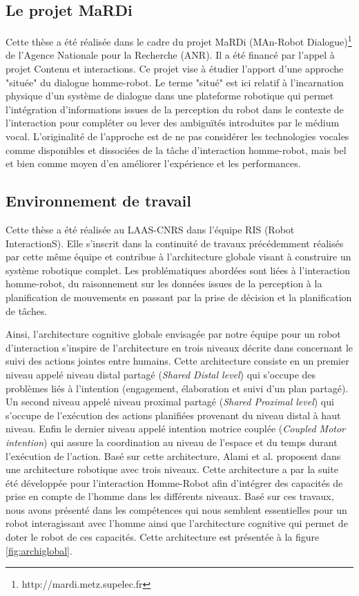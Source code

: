 \documentclass[a4paper,11pt,twoside]{StyleThese}
\begin{document}
\subsection{Le projet MaRDi}
Cette thèse a été réalisée dans le cadre du projet MaRDi (MAn-Robot Dialogue)\footnote{http://mardi.metz.supelec.fr} de l’Agence Nationale pour la Recherche (ANR). Il a été financé par l’appel à projet Contenu et interactions.
Ce projet vise à étudier l’apport d’une approche "située" du dialogue homme-robot. Le terme "situé" est ici relatif à l’incarnation physique d’un système de dialogue dans une plateforme robotique qui permet l’intégration d’informations issues de la perception du robot dans le contexte de l’interaction pour compléter ou lever des ambiguïtés introduites par le médium vocal. L’originalité de l’approche est de ne pas considérer les technologies vocales comme disponibles et dissociées de la tâche d’interaction homme-robot, mais bel et bien comme moyen d’en améliorer l’expérience et les performances.

\subsection{Environnement de travail}
\label{sec:workEnv}
Cette thèse a été réalisée au LAAS-CNRS dans l'équipe RIS (Robot InteractionS).
Elle s'inscrit dans la continuité de travaux précédemment réalisés par cette même équipe et contribue à l'architecture globale visant à construire un système robotique complet. Les problématiques abordées sont liées à l'interaction homme-robot, du raisonnement sur les données issues de la perception à la planification de mouvements en passant par la prise de décision et la planification de tâches.

Ainsi, l'architecture cognitive globale envisagée par notre équipe pour un robot d'interaction s'inspire de l'architecture en trois niveaux décrite dans \cite{pacherie2012phenomenology} concernant le suivi des actions jointes entre humains. Cette architecture consiste en un premier niveau appelé niveau distal partagé (\textit{Shared Distal level}) qui s'occupe des problèmes liés à l'intention (engagement, élaboration et suivi d'un plan partagé). Un second niveau appelé niveau proximal partagé (\textit{Shared Proximal level}) qui s'occupe de l'exécution des actions planifiées provenant du niveau distal à haut niveau. Enfin le dernier niveau appelé  intention motrice couplée (\textit{Coupled Motor intention}) qui assure la coordination au niveau de l'espace et du temps durant l'exécution de l'action.
Basé sur cette architecture, Alami et al. proposent dans \cite{alami1998architecture} une architecture robotique avec trois niveaux. Cette architecture a par la suite été développée pour l'interaction Homme-Robot \cite{alami2011robot,alami2013human,fioreiser2014} afin d'intégrer des capacités de prise en compte de l'homme dans les différents niveaux. 
Basé sur ces travaux, nous avons présenté dans \cite{Devin16} les compétences qui nous semblent essentielles pour un robot interagissant avec l'homme ainsi que l'architecture cognitive qui permet de doter le robot de ces capacités.
Cette architecture est présentée à la figure \ref{fig:archiglobal}.
\end{document}
